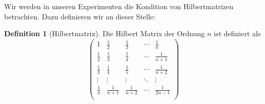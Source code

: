 \documentclass[smallheadings]{scrartcl}
\theoremstyle{definition}
\newtheorem{definition}{Definition}[section]
\begin{document}
Wir werden in unseren Experimenten die Kondition von Hilbertmatrizen betrachten. Dazu definieren wir an dieser Stelle:
		\begin{definition}[Hilbertmatrix]
		Die Hilbert Matrix der Ordnung $n$ ist definiert als 
		$$\begin{pmatrix}
		1&\frac{1}{2}&\frac{1}{3}&\cdots & \frac{1}{n}\\
		\frac{1}{2}&\frac{1}{3}&\frac{1}{4}&\cdots &\frac{1}{n+1}\\
		\frac{1}{3}&\frac{1}{4}&\frac{1}{5}&\cdots &\frac{1}{n+2}\\
		\vdots &\vdots &\vdots &\ddots &\vdots\\
		\frac{1}{n}&\frac{1}{n+1}&\frac{1}{n+2}&\cdots &\frac{1}{2n-1}\\
		\end{pmatrix}$$
		\end{definition}
		
\end{document}
